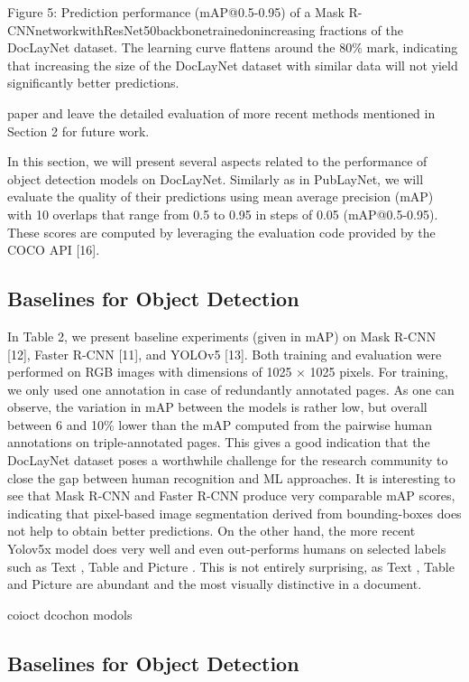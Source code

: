 Figure 5: Prediction performance (mAP@0.5-0.95) of a Mask R-CNNnetworkwithResNet50backbonetrainedonincreasing fractions of the DocLayNet dataset. The learning curve flattens around the 80\% mark, indicating that increasing the size of the DocLayNet dataset with similar data will not yield significantly better predictions.

paper and leave the detailed evaluation of more recent methods mentioned in Section 2 for future work.

In this section, we will present several aspects related to the performance of object detection models on DocLayNet. Similarly as in PubLayNet, we will evaluate the quality of their predictions using mean average precision (mAP) with 10 overlaps that range from 0.5 to 0.95 in steps of 0.05 (mAP@0.5-0.95). These scores are computed by leveraging the evaluation code provided by the COCO API [16].

\subsection{Baselines for Object Detection}

In Table 2, we present baseline experiments (given in mAP) on Mask R-CNN [12], Faster R-CNN [11], and YOLOv5 [13]. Both training and evaluation were performed on RGB images with dimensions of 1025 × 1025 pixels. For training, we only used one annotation in case of redundantly annotated pages. As one can observe, the variation in mAP between the models is rather low, but overall between 6 and 10\% lower than the mAP computed from the pairwise human annotations on triple-annotated pages. This gives a good indication that the DocLayNet dataset poses a worthwhile challenge for the research community to close the gap between human recognition and ML approaches. It is interesting to see that Mask R-CNN and Faster R-CNN produce very comparable mAP scores, indicating that pixel-based image segmentation derived from bounding-boxes does not help to obtain better predictions. On the other hand, the more recent Yolov5x model does very well and even out-performs humans on selected labels such as Text , Table and Picture . This is not entirely surprising, as Text , Table and Picture are abundant and the most visually distinctive in a document.

coioct dcochon modols

\subsection{Baselines for Object Detection}

